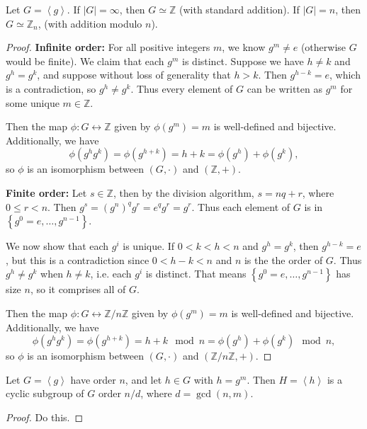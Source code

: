 \documentclass[10pt]{report}
\begin{document}
\begin{thrm}{}{}
	Let $G = \left\langle g \right\rangle$. If $|G| = \infty$, then $G \simeq \mathbb{Z}$ (with standard addition). If $|G| = n$, then $G \simeq \mathbb{Z}_n$, (with addition modulo $n$).
\end{thrm}
\begin{proof}
	\textbf{Infinite order:} For all positive integers $m$, we know $g^m \neq e$ (otherwise $G$ would be finite). We claim that each $g^m$ is distinct. Suppose we have $h \neq k$ and $g^h = g^k$, and suppose without loss of generality that $h > k$. Then $g^{h-k}=e$, which is a contradiction, so $g^h \neq g^k$. Thus every element of $G$ can be written as $g^m$ for some unique $m \in \mathbb{Z}$.

	Then the map $\phi: G \leftrightarrow \mathbb{Z}$ given by $\phi(g^m) = m$ is well-defined and bijective. Additionally, we have
	\[
		\phi(g^hg^k) = \phi(g^{h+k}) = h+k = \phi(g^h) + \phi(g^k),
	\] so $\phi$ is an isomorphism between $(G, \cdot)$ and $(\mathbb{Z}, +)$.

	\textbf{Finite order:} Let $s \in \mathbb{Z}$, then by the division algorithm, $s = nq+r$, where $0 \leq r < n$. Then $g^{s}=(g^n)^q g^r = e^q g^r = g^r$. Thus each element of $G$ is in $\left\{ g^0=e, \dots, g^{n-1} \right\}$.

	We now show that each $g^i$ is unique. If $0 < k < h< n$ and $g^h=g^k$, then $g^{h-k}=e$, but this is a contradiction since $0 <h-k < n$ and $n$ is the the order of $G$. Thus $g^h \neq g^k$ when $h \neq k$, i.e. each $g^i$ is distinct. That means $\left\{ g^0=e, \dots, g^{n-1} \right\}$ has size $n$, so it comprises all of $G$.

	Then the map $\phi: G \leftrightarrow \mathbb{Z}/n\mathbb{Z}$ given by $\phi(g^m)=m$ is well-defined and bijective. Additionally, we have
	\[
		\phi(g^h g^k) = \phi(g^{h+k}) = h+k \mod n = \phi(g^h) + \phi(g^k) \mod n,
	\] so $\phi$ is an isomorphism between $(G, \cdot)$ and $(\mathbb{Z}/n\mathbb{Z}, +)$.
\end{proof}

\begin{thrm}{}{}
	Let $G= \left\langle g \right\rangle$ have order $n$, and let $h \in G$ with $h = g^m$. Then $H = \left\langle h \right\rangle$ is a cyclic subgroup of $G$ order $n/d$, where $d = \gcd(n,m)$.
\end{thrm}
\begin{proof}
	{\color{red}Do this.}
\end{proof}
\end{document}
